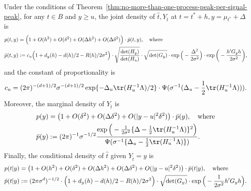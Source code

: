 \documentclass{article}
\begin{document}
	\begin{theorem}
		\label{thm:approximate-joint-distribution}
		Under the conditions of Theorem~\ref{thm:no-more-than-one-process-peak-per-signal-peak}, for any $t \in B$ and $y \geq u$, the joint density of $\hat{t},Y_{\hat{t}}$ at $t = t^* + h,y = \mu_{t^*} + \Delta$ is
		\begin{equation}
			\label{eqn:approximate-joint-density}
			\begin{aligned}
				p(t,y) & = \Big(1 + O(h^2) + O(\delta^2) + O(\Delta h^2) + O(\Delta\delta^2)\Big) \cdot \bar{p}(t,y), \quad {\rm where} \\
				\bar{p}(t,y) & := c_u\Big(1 + d_y(h) - d(h)/2 - R(h)/2\sigma^2\Big) \cdot \sqrt{\frac{\det(H_{y})}{\det(H_u)}} \cdot \sqrt{\det(G_y)} \cdot \exp\Big(-\frac{\Delta^2}{2\sigma^2}\Big) \cdot \exp\bigg(-\frac{h' G_{y}h}{2\sigma^2}\bigg),
			\end{aligned}
		\end{equation}
		and the constant of proportionality is
		\begin{equation}
			\label{eqn:approximate-joint-density-constant-of-proportionality}
			c_u = 
			(2\pi)^{-(d + 1)/2} \sigma^{-(d + 1)/2} \exp\{-\Delta_u \tr(H_u^{-1}\Lambda)/2\} \cdot {\Psi(\sigma^{-1}(\Delta_u - \frac{1}{2}\tr(H_u^{-1}\Lambda)))}.
		\end{equation}
		Moreover, the marginal density of $Y_{\hat{t}}$ is 
		\begin{equation}
			\label{eqn:approximate-marginal-density-height}
			\begin{aligned}
				p(y) & = \big(1 + O(\delta^2) + O(\Delta \delta^2) + O(|y - u|^2 \delta^2)\big) \cdot \bar{p}(y), \quad {\rm where} \\ 
				\bar{p}(y) & := (2\pi)^{-1}\sigma^{-1/2}\frac{ \exp\Big(-\frac{1}{2\sigma^2}\{\Delta - \frac{1}{2}\tr(H_u^{-1}\Lambda)\}^2\Big) }{\Psi(\sigma^{-1}\{\Delta_u - \frac{1}{2}\tr(H_u^{-1}\Lambda)\})}.
			\end{aligned}
		\end{equation}
		Finally, the conditional density of $\hat{t}$ given $Y_{\hat{t}} = y$ is 
		\begin{equation}
			\label{eqn:approximate-conditional-density-location}
			\begin{aligned}
				p(t|y) & = \big(1 + O(h^2) + O(\delta^2) + O(\Delta h^2) + O(\Delta\delta^2) + O(|y - u|^2 \delta^2)\big) \cdot \bar{p}(t|y), \quad {\rm where} \\
				\bar{p}(t|y) & := (2\pi\sigma^{d})^{-1/2} \cdot \Big(1 + d_y(h) - d(h)/2 - R(h)/2\sigma^2\Big) \cdot \sqrt{\det(G_y)} \cdot \exp\Big(-\frac{1}{2\sigma^2}h'G_y h\Big).
			\end{aligned}
		\end{equation}
	\end{theorem}
\end{document}
